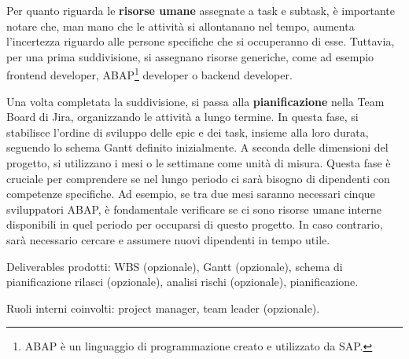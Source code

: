         Per quanto riguarda le \textbf{risorse umane} assegnate a task e subtask, è importante notare che, man mano che le attività si allontanano nel tempo,
        aumenta l'incertezza riguardo alle persone specifiche che si occuperanno di esse. Tuttavia, per una prima suddivisione, si assegnano risorse
        generiche, come ad esempio frontend developer, ABAP\footnote{ABAP è un linguaggio di programmazione creato e utilizzato da SAP.} developer o backend developer.
        
        Una volta completata la suddivisione, si passa alla \textbf{pianificazione} nella Team Board di Jira, organizzando le attività a lungo termine.
        In questa fase, si stabilisce l'ordine di sviluppo delle epic e dei task, insieme alla loro durata, seguendo lo schema Gantt definito inizialmente.
        A seconda delle dimensioni del progetto, si utilizzano i mesi o le settimane come unità di misura. Questa fase è cruciale per comprendere se nel lungo
        periodo ci sarà bisogno di dipendenti con competenze specifiche. Ad esempio, se tra due mesi saranno necessari cinque sviluppatori ABAP,
        è fondamentale verificare se ci sono risorse umane interne disponibili in quel periodo per occuparsi di questo progetto.
        In caso contrario, sarà necessario cercare e assumere nuovi dipendenti in tempo utile.

        Deliverables prodotti: \ac{WBS} (opzionale), Gantt (opzionale), schema di pianificazione rilasci (opzionale), analisi rischi (opzionale), pianificazione.

        Ruoli interni coinvolti: project manager, team leader (opzionale).

